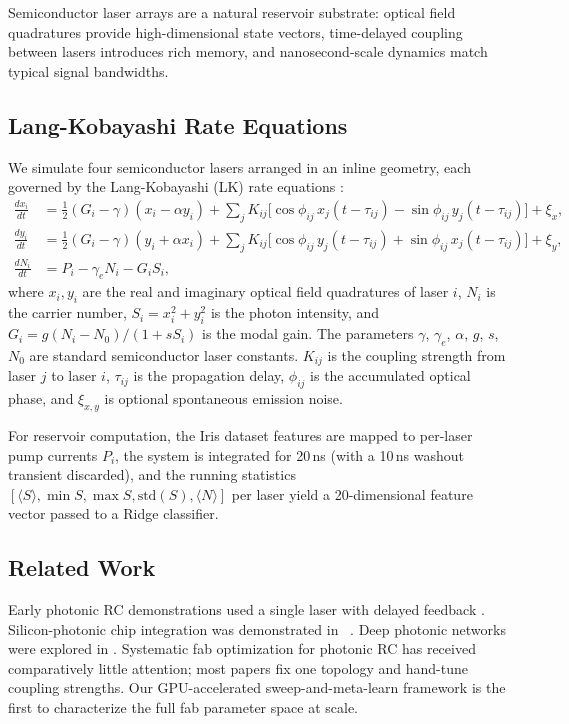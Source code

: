 \documentclass{article}
\begin{document}
Semiconductor laser arrays are a natural reservoir substrate: optical
field quadratures provide high-dimensional state vectors, time-delayed
coupling between lasers introduces rich memory, and nanosecond-scale dynamics
match typical signal bandwidths.

\subsection{Lang-Kobayashi Rate Equations}
\label{sec:lk_model}

We simulate four semiconductor lasers arranged in an inline geometry,
each governed by the Lang-Kobayashi (LK) rate equations
\citep{lang1980external}:
\begin{align}
  \frac{dx_i}{dt} &= \tfrac{1}{2}(G_i - \gamma)(x_i - \alpha y_i) + \sum_j K_{ij}\bigl[\cos\phi_{ij}\,x_j(t-\tau_{ij}) - \sin\phi_{ij}\,y_j(t-\tau_{ij})\bigr] + \xi_x, \label{eq:lk_x}\\
  \frac{dy_i}{dt} &= \tfrac{1}{2}(G_i - \gamma)(y_i + \alpha x_i) + \sum_j K_{ij}\bigl[\cos\phi_{ij}\,y_j(t-\tau_{ij}) + \sin\phi_{ij}\,x_j(t-\tau_{ij})\bigr] + \xi_y, \label{eq:lk_y}\\
  \frac{dN_i}{dt} &= P_i - \gamma_e N_i - G_i S_i, \label{eq:lk_n}
\end{align}
where $x_i, y_i$ are the real and imaginary optical field quadratures of
laser $i$, $N_i$ is the carrier number, $S_i = x_i^2 + y_i^2$ is the photon
intensity, and $G_i = g(N_i - N_0)/(1 + s S_i)$ is the modal gain.
The parameters $\gamma$, $\gamma_e$, $\alpha$, $g$, $s$, $N_0$ are
standard semiconductor laser constants.
$K_{ij}$ is the coupling strength from laser $j$ to laser $i$,
$\tau_{ij}$ is the propagation delay, $\phi_{ij}$ is the accumulated optical
phase, and $\xi_{x,y}$ is optional spontaneous emission noise.

For reservoir computation, the Iris dataset features are mapped to per-laser
pump currents $P_i$, the system is integrated for 20\,ns (with a 10\,ns
washout transient discarded), and the running statistics
$[\langle S\rangle, \min S, \max S, \mathrm{std}(S), \langle N\rangle]$
per laser yield a 20-dimensional feature vector passed to a Ridge classifier.

\subsection{Related Work}
\label{sec:related}

Early photonic RC demonstrations used a single laser with delayed feedback
\citep{appeltant2011information,brunner2013parallel,larger2012photonic}.
Silicon-photonic chip integration was demonstrated in
\citeauthor{vandoorne2014experimental}~\citeyearpar{vandoorne2014experimental}.
Deep photonic networks were explored in \citet{shen2017deep}.
Systematic fab optimization for photonic RC has received comparatively little
attention; most papers fix one topology and hand-tune coupling strengths.
Our GPU-accelerated sweep-and-meta-learn framework is the first to characterize
the full fab parameter space at scale.
\end{document}
